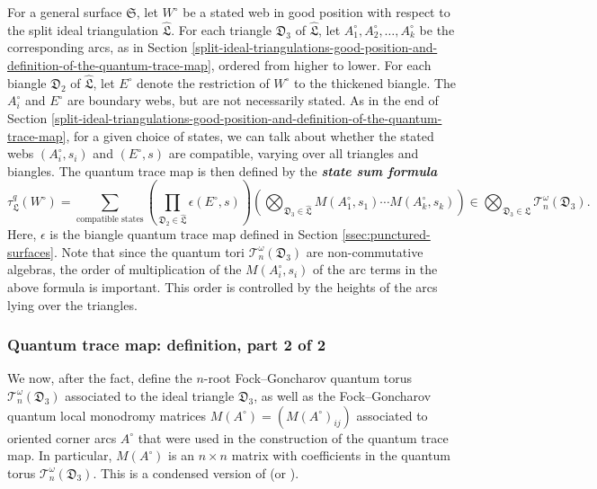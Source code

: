\documentclass[12pt,
	]{amsart}
\theoremstyle{definition}
\renewcommand{\hat}{\widehat}
\newcommand{\mcal}[1]{\mathcal{#1}}
\newcommand{\mfrak}[1]{\mathfrak{#1}}
\newcommand{\lp}{\left(}\newcommand{\rp}{\right)}
\newcommand{\define}[1]{{\textit{\textbf{#1}}}}
\newcommand{\unbased}[1]{#1^\circ}
\newcommand{\surf}{\mfrak{S}}
\newcommand{\biang}{\mfrak{D}_2}
\newcommand{\ttriang}{\mfrak{D}_3}
\newcommand{\idealtriang}{\mfrak{L}}
\newcommand{\splitidealtriang}{\hat{\idealtriang}}
\newcommand{\wroot}{\omega}
\newcommand{\qtorus}[1]{\mcal{T}_n^\wroot(#1)}
\newcommand{\qtr}{\tau^q_\idealtriang}
\newcommand{\counit}{\epsilon}
\begin{document}
For a general surface $\surf$, let $\unbased{W}$ be a stated web in good position with respect to the split ideal triangulation $\splitidealtriang$.  For each triangle $\ttriang$ of $\splitidealtriang$, let $\unbased{A}_1, \unbased{A}_2, \dots, \unbased{A}_k$ be the corresponding arcs, as in Section \ref{split-ideal-triangulations-good-position-and-definition-of-the-quantum-trace-map}, ordered from higher to lower.  For each biangle $\biang$ of $\splitidealtriang$, let $\unbased{E}$ denote the restriction of $\unbased{W}$ to the thickened biangle.  The $\unbased{A}_i$ and $\unbased{E}$ are boundary webs, but are not necessarily stated.  As in the end of Section \ref{split-ideal-triangulations-good-position-and-definition-of-the-quantum-trace-map}, for a given choice of states, we can talk about whether the stated webs $(\unbased{A}_i,s_i)$ and $(\unbased{E},s)$ are compatible, varying over all triangles and biangles.  The quantum trace map is then defined by the \define{state sum formula}
\begin{equation*}
\qtr(\unbased{W})=\sum_{\text{compatible states}}\lp\prod_{\biang\in\splitidealtriang}\counit(\unbased{E},s)\rp
\lp\bigotimes_{\ttriang\in\splitidealtriang}M(\unbased{A}_1,s_1)\cdots M(\unbased{A}_k,s_k)\rp
\in\bigotimes_{\ttriang\in\idealtriang}\qtorus{\ttriang}.
\end{equation*}
Here, $\counit$ is the biangle quantum trace map defined in Section \ref{ssec:punctured-surfaces}.  Note that since the quantum tori $\qtorus{\ttriang}$ are non-commutative algebras, the order of multiplication of the $M(\unbased{A}_i,s_i)$ of the arc terms in the above formula is important.  This order is controlled by the heights of the arcs lying over the triangles.  

\subsubsection{Quantum trace map:  definition, part 2 of 2}\label{ssec:fock-goncharov-quantum-torus}

We now, after the fact, define the $n$-root Fock--Goncharov quantum torus $\qtorus{\ttriang}$ associated to the ideal triangle $\ttriang$, as well as the Fock--Goncharov quantum local monodromy matrices $M(\unbased{A})=(M(\unbased{A})_{ij})$ associated to oriented corner arcs $\unbased{A}$ that were used in the construction of the quantum trace map.  In particular, $M(\unbased{A})$ is an $n\times n$ matrix with coefficients in the quantum torus $\qtorus{\ttriang}$.  This is a condensed version of \cite{douglasMR4717274} (or \cite{douglas2021points}).  
\end{document}
